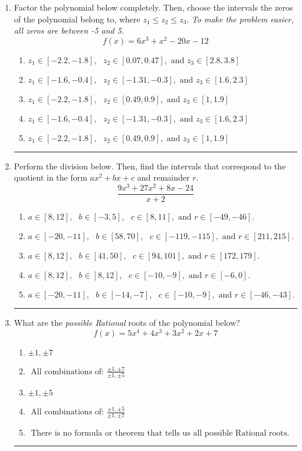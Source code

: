 \documentclass[14pt]{extbook}
\newcommand{\litem}[1]{\item#1\hspace*{-1cm}\rule{\textwidth}{0.4pt}}
\begin{document}
\begin{enumerate}
\litem{
Factor the polynomial below completely. Then, choose the intervals the zeros of the polynomial belong to, where $z_1 \leq z_2 \leq z_3$. \textit{To make the problem easier, all zeros are between -5 and 5.}\[ f(x) = 6x^{3} + x^{2} -20 x -12 \]\begin{enumerate}[label=\Alph*.]
\item \( z_1 \in [-2.2, -1.8], \text{   }  z_2 \in [0.07, 0.47], \text{   and   } z_3 \in [2.8, 3.8] \)
\item \( z_1 \in [-1.6, -0.4], \text{   }  z_2 \in [-1.31, -0.3], \text{   and   } z_3 \in [1.6, 2.3] \)
\item \( z_1 \in [-2.2, -1.8], \text{   }  z_2 \in [0.49, 0.9], \text{   and   } z_3 \in [1, 1.9] \)
\item \( z_1 \in [-1.6, -0.4], \text{   }  z_2 \in [-1.31, -0.3], \text{   and   } z_3 \in [1.6, 2.3] \)
\item \( z_1 \in [-2.2, -1.8], \text{   }  z_2 \in [0.49, 0.9], \text{   and   } z_3 \in [1, 1.9] \)

\end{enumerate} }
\litem{
Perform the division below. Then, find the intervals that correspond to the quotient in the form $ax^2+bx+c$ and remainder $r$.\[ \frac{9x^{3} +27 x^{2} +8 x -24}{x + 2} \]\begin{enumerate}[label=\Alph*.]
\item \( a \in [8, 12], \text{   } b \in [-3, 5], \text{   } c \in [8, 11], \text{   and   } r \in [-49, -46]. \)
\item \( a \in [-20, -11], \text{   } b \in [58, 70], \text{   } c \in [-119, -115], \text{   and   } r \in [211, 215]. \)
\item \( a \in [8, 12], \text{   } b \in [41, 50], \text{   } c \in [94, 101], \text{   and   } r \in [172, 179]. \)
\item \( a \in [8, 12], \text{   } b \in [8, 12], \text{   } c \in [-10, -9], \text{   and   } r \in [-6, 0]. \)
\item \( a \in [-20, -11], \text{   } b \in [-14, -7], \text{   } c \in [-10, -9], \text{   and   } r \in [-46, -43]. \)

\end{enumerate} }
\litem{
What are the \textit{possible Rational} roots of the polynomial below?\[ f(x) = 5x^{4} +4 x^{3} +3 x^{2} +2 x + 7 \]\begin{enumerate}[label=\Alph*.]
\item \( \pm 1,\pm 7 \)
\item \( \text{ All combinations of: }\frac{\pm 1,\pm 7}{\pm 1,\pm 5} \)
\item \( \pm 1,\pm 5 \)
\item \( \text{ All combinations of: }\frac{\pm 1,\pm 5}{\pm 1,\pm 7} \)
\item \( \text{ There is no formula or theorem that tells us all possible Rational roots.} \)


\end{enumerate}}
\end{enumerate}
\end{document}
